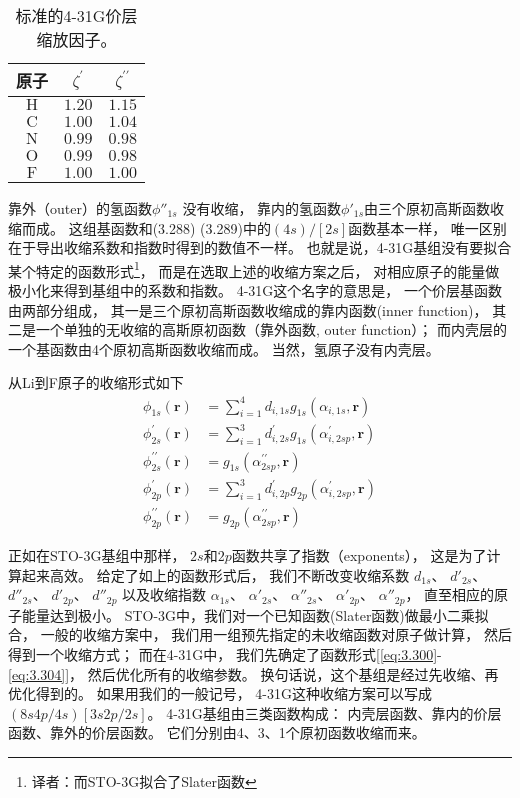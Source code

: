 \begin{table}[]
    \centering
    \begin{tabular}{ccc}
    \toprule 
    原子         & $\zeta^{\prime}$ & $\zeta^{\prime \prime}$ \\
    \midrule 
    $\mathrm{H}$ & $1.20$ & $1.15$ \\
    $\mathrm{C}$ & $1.00$ & $1.04$ \\
    $\mathrm{N}$ & $0.99$ & $0.98$ \\
    $\mathrm{O}$ & $0.99$ & $0.98$ \\
    $\mathrm{F}$ & $1.00$ & $1.00$ \\
    \bottomrule
    \end{tabular}
    \caption{标准的4-31G价层缩放因子。}
    \label{tab:3.9}
\end{table}

靠外（outer）的氢函数$\phi''_{1s}$ 没有收缩，
靠内的氢函数$\phi'_{1s}$由三个原初高斯函数收缩而成。
这组基函数和(3.288) (3.289)中的$(4s)/[2s]$函数基本一样，
唯一区别在于导出收缩系数和指数时得到的数值不一样。
也就是说，4-31G基组没有要拟合某个特定的函数形式\footnote{
译者：而STO-3G拟合了Slater函数
}，
而是在选取上述的收缩方案之后，
对相应原子的能量做极小化来得到基组中的系数和指数。
4-31G这个名字的意思是，
一个价层基函数由两部分组成，
其一是三个原初高斯函数收缩成的靠内函数(inner function)，
其二是一个单独的无收缩的高斯原初函数（靠外函数, outer function）；
而内壳层的一个基函数由4个原初高斯函数收缩而成。
当然，氢原子没有内壳层。

从Li到F原子的收缩形式如下
\begin{align}
\phi_{1 s}(\mathbf{r}) & = \sum_{i=1}^4 d_{i, 1 s} g_{1 s}\left(\alpha_{i, 1 s}, \mathbf{r}\right) 
\label{eq:3.300}
\\
\phi_{2 s}^{\prime}(\mathbf{r}) & = \sum_{i=1}^3 d_{i, 2 s}^{\prime} g_{1 s}\left(\alpha_{i, 2 s p}^{\prime}, \mathbf{r}\right) \\
\phi_{2 s}^{\prime \prime}(\mathbf{r}) & = g_{1 s}\left(\alpha_{2 s p}^{\prime \prime}, \mathbf{r}\right) \\
\phi_{2 p}^{\prime}(\mathbf{r}) & = \sum_{i=1}^3 d_{i, 2 p}^{\prime} g_{2 p}\left(\alpha_{i, 2 s p}^{\prime}, \mathbf{r}\right) \\
\phi_{2 p}^{\prime \prime}(\mathbf{r}) & = g_{2 p}\left(\alpha_{2 s p}^{\prime \prime}, \mathbf{r}\right)
\label{eq:3.304}
\end{align}

正如在STO-3G基组中那样，
$2s$和$2p$函数共享了指数（exponents），
这是为了计算起来高效。
给定了如上的函数形式后，
我们不断改变收缩系数
$d_{1s}$、 $d'_{2s}$、 $d''_{2s}$、 $d'_{2p}$、 $d''_{2p}$
以及收缩指数
$\alpha_{1s}$、 $\alpha'_{2s}$、 $\alpha''_{2s}$、 $\alpha'_{2p}$、 $\alpha''_{2p}$，
直至相应的原子能量达到极小。
STO-3G中，我们对一个已知函数(Slater函数)做最小二乘拟合，
一般的收缩方案中，
我们用一组预先指定的未收缩函数对原子做计算，
然后得到一个收缩方式；
而在4-31G中，
我们先确定了函数形式[\autoref{eq:3.300}-\autoref{eq:3.304}]，
然后优化所有的收缩参数。
换句话说，这个基组是经过先收缩、再优化得到的。
如果用我们的一般记号，
4-31G这种收缩方案可以写成$(8s4p/4s)[3s2p/2s]$。
4-31G基组由三类函数构成：
内壳层函数、靠内的价层函数、靠外的价层函数。
它们分别由4、3、1个原初函数收缩而来。

